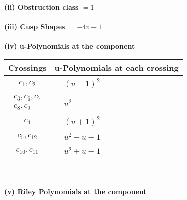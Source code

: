\documentclass[1p]{elsarticle_modified}
\theoremstyle{definition}
\begin{document}
\flushleft \textbf{(ii) Obstruction class $= 1$}\\~\\
\flushleft \textbf{(iii) Cusp Shapes $= -4 v-1$}\\~\\
\newpage\renewcommand{\arraystretch}{1}
\flushleft \textbf{(iv) u-Polynomials at the component}\newline \\
\begin{tabular}{m{50pt}|m{274pt}}
Crossings & \hspace{64pt}u-Polynomials at each crossing \\
\hline $$\begin{aligned}c_{1},c_{2}\end{aligned}$$&$\begin{aligned}
&(u-1)^2
\end{aligned}$\\
\hline $$\begin{aligned}c_{3},c_{6},c_{7}\\c_{8},c_{9}\end{aligned}$$&$\begin{aligned}
&u^2
\end{aligned}$\\
\hline $$\begin{aligned}c_{4}\end{aligned}$$&$\begin{aligned}
&(u+1)^2
\end{aligned}$\\
\hline $$\begin{aligned}c_{5},c_{12}\end{aligned}$$&$\begin{aligned}
&u^2- u+1
\end{aligned}$\\
\hline $$\begin{aligned}c_{10},c_{11}\end{aligned}$$&$\begin{aligned}
&u^2+u+1
\end{aligned}$\\
\hline
\end{tabular}\\~\\
\newpage\renewcommand{\arraystretch}{1}
\flushleft \textbf{(v) Riley Polynomials at the component}\newline \\
\end{document}
